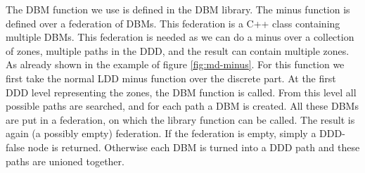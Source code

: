 The DBM function we use is defined in the \uppaal{} DBM library. The minus function is defined over a federation of DBMs. This federation is a C++ class containing multiple DBMs. This federation is needed as we can do a minus over a collection of zones, multiple paths in the DDD, and the result can contain multiple zones. As already shown in the example of figure \ref{fig:md-minus}. For this function we first take the normal LDD minus function over the discrete part. At the first DDD level representing the zones, the DBM function is called. From this level all possible paths are searched, and for each path a DBM is created. All these DBMs are put in a federation, on which the library function can be called. The result is again (a possibly empty) federation. If the federation is empty, simply a DDD-false node is returned. Otherwise each DBM is turned into a DDD path and these paths are unioned together.